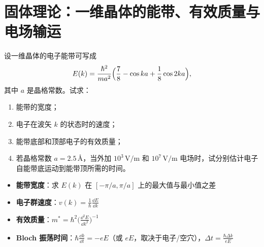 \section{固体理论：一维晶体的能带、有效质量与电场输运}
\label{sec:1d-band-transport}

\begin{modelbox}
设一维晶体的电子能带可写成
\begin{equation}
E(k)=\frac{\hbar^2}{ma^2}\Bigl(\frac{7}{8}-\cos ka+\frac{1}{8}\cos 2ka\Bigr),
\end{equation}
其中 $a$ 是晶格常数。试求：
\begin{enumerate}
    \item 能带的宽度；
    \item 电子在波矢 $k$ 的状态时的速度；
    \item 能带底部和顶部电子的有效质量；
    \item 若晶格常数 $a=2.5\,\text{\AA}$，当外加 $10^3\,\text{V/m}$ 和 $10^7\,\text{V/m}$ 电场时，试分别估计电子自能带底运动到能带顶所需的时间。
\end{enumerate}
\end{modelbox}

\begin{tipbox}[考点快速分析]
\begin{itemize}
    \item \textbf{能带宽度}：求 $E(k)$ 在 $[-\pi/a,\pi/a]$ 上的最大值与最小值之差
    \item \textbf{电子群速度}：$v(k)=\frac{1}{\hbar}\frac{\dd E}{\dd k}$
    \item \textbf{有效质量}：$m^*=\hbar^2\bigl(\frac{\dd^2E}{\dd k^2}\bigr)^{-1}$
    \item \textbf{Bloch 振荡时间}：$\hbar\frac{\dd k}{\dd t}=-eE$（或 $eE$，取决于电子/空穴），$\Delta t=\frac{\hbar\Delta k}{eE}$
\end{itemize}
\end{tipbox}

